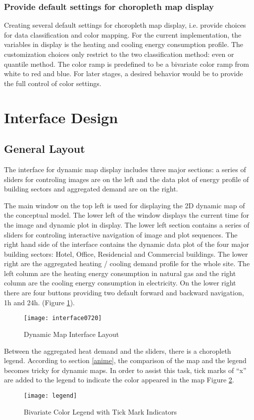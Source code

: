 \documentclass[hidelinks,12pt]{article}
\newcommand{\fref}[1]{Figure \ref{#1}}
\begin{document}
\subsubsection{Provide default settings for choropleth map display}
Creating several default settings for choropleth map display,
i.e. provide choices for data classification and color mapping. For
the current implementation, the variables in display is the heating
and cooling energy consumption profile. The customization choices only
restrict to the two classification method: even or quantile
method. The color ramp is predefined to be a bivariate color ramp from
white to red and blue. For later stages, a desired behavior would be
to provide the full control of color settings.

\section{Interface Design}
\subsection {General Layout}
The interface for dynamic map display includes three major sections: a
series of sliders for controling images are on the left and the data
plot of energy profile of building sectors and aggregated demand are
on the right.

The main window on the top left is used for displaying the 2D dynamic
map of the conceptual model. The lower left of the window displays the
current time for the image and dynamic plot in display. The lower left
section contains a series of sliders for controling interactive
navigation of image and plot sequences. The right hand side of the
interface contains the dynamic data plot of the four major building
sectors: Hotel, Office, Residencial and Commercial buildings. The
lower right are the aggregated heating / cooling demand profile for
the whole site. The left column are the heating energy consumption in
natural gas and the right column are the cooling energy consumption in
electricity. On the lower right there are four buttons providing two
default forward and backward navigation, 1h and
24h. (\fref{fig:interface0720}).
\begin{figure}[h!]
  \centering
  \texttt{[image: interface0720]}
  \caption{Dynamic Map Interface Layout}
  \label{fig:interface0720}
\end{figure}

Between the aggregated heat demand and the sliders, there is a
choropleth legend. According to section \ref{anime}, the comparison of
the map and the legend becomes tricky for dynamic maps. In order to
assist this task, tick marks of ``x'' are added to the legend to
indicate the color appeared in the map \fref{fig:legend}.
\begin{figure}[h!]
  \centering
  \texttt{[image: legend]}
  \caption{Bivariate Color Legend with Tick Mark Indicators}
  \label{fig:legend}
\end{figure}
\end{document}
